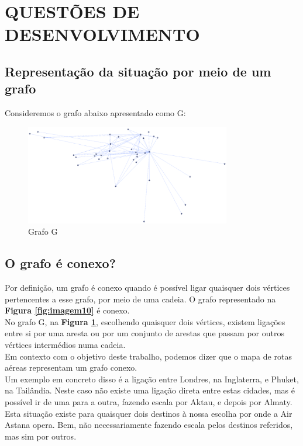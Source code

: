 \clearpage
\section{QUESTÕES DE DESENVOLVIMENTO}
\label{section}
\subsection{Representação da situação por meio de um grafo}
Consideremos o grafo abaixo apresentado como G:\\
\begin{figure}[h]
    \centering
    \includegraphics[width=0.8\textwidth]{imgs/Figura11}
    \caption{Grafo G\label{fig:imagem11}}
\end{figure}
\subsection{ O grafo é conexo?}
\indent Por definição, um grafo é conexo quando é possível ligar quaisquer dois vértices pertencentes a esse grafo, por meio de uma cadeia.
O grafo representado na \textbf{Figura \ref{fig:imagem10}} é conexo.\\
\indent No grafo G, na \textbf{Figura \ref{fig:imagem11}}, escolhendo quaisquer dois vértices, existem ligações entre si por uma
aresta ou por um conjunto de arestas que passam por outros vértices intermédios numa cadeia.\\
\indent Em contexto com o objetivo deste trabalho, podemos dizer que o mapa de rotas aéreas representam um 
grafo conexo.\\
\indent Um exemplo em concreto disso é a ligação entre Londres, na Inglaterra, e Phuket, na Tailândia. Neste 
caso não existe uma ligação direta entre estas cidades, mas é possível ir de uma para a outra, fazendo escala 
por Aktau, e depois por Almaty. Esta situação existe para quaisquer dois destinos à nossa escolha por onde a 
Air Astana opera. Bem, não necessariamente fazendo escala pelos destinos referidos, mas sim por outros.\\
